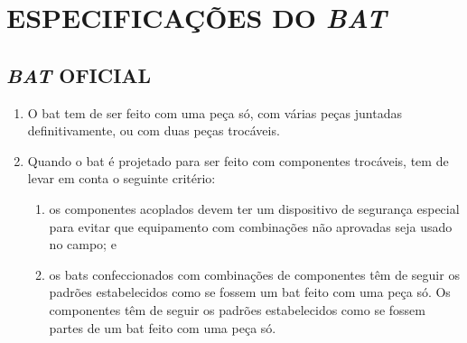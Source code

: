 \chapter{ESPECIFICAÇÕES DO \textit{BAT}}
\minitoc%

\section{\textit{BAT} OFICIAL}

\begin{enumerate}[label=(\arabic*)]
	\item  O \gls{bat} tem de ser feito com uma peça só, com várias peças juntadas definitivamente, ou com duas peças trocáveis.
	\item  Quando o \gls{bat} é projetado para ser feito com componentes trocáveis, tem de levar em conta o seguinte critério:

		\begin{enumerate}[label=\roman*.]
			\item os componentes acoplados devem ter um dispositivo de segurança especial para evitar que equipamento com combinações não aprovadas seja usado no campo; e
			\item os \glspl{bat} confeccionados com combinações de componentes têm de seguir os padrões estabelecidos como se fossem um \gls{bat} feito com uma peça só. Os  componentes têm de seguir os padrões estabelecidos como se fossem partes de um \gls{bat} feito com uma peça só.
		\end{enumerate}


\end{enumerate}
